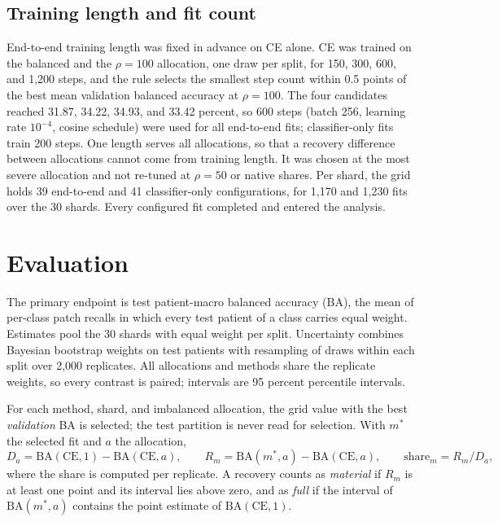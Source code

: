 \documentclass[11pt]{article}
\begin{document}
\subsection{Training length and fit count}
End-to-end training length was fixed in advance on CE alone. CE was trained on the balanced and the $\rho=100$ allocation, one draw per split, for 150, 300, 600, and 1,200 steps, and the rule selects the smallest step count within 0.5 points of the best mean validation balanced accuracy at $\rho=100$. The four candidates reached 31.87, 34.22, 34.93, and 33.42 percent, so 600 steps (batch 256, learning rate $10^{-4}$, cosine schedule) were used for all end-to-end fits; classifier-only fits train 200 steps. One length serves all allocations, so that a recovery difference between allocations cannot come from training length. It was chosen at the most severe allocation and not re-tuned at $\rho=50$ or native shares. Per shard, the grid holds 39 end-to-end and 41 classifier-only configurations, for 1,170 and 1,230 fits over the 30 shards. Every configured fit completed and entered the analysis.

\section{Evaluation}
\label{sec:evaluation}
The primary endpoint is test patient-macro balanced accuracy (BA), the mean of per-class patch recalls in which every test patient of a class carries equal weight. Estimates pool the 30 shards with equal weight per split. Uncertainty combines Bayesian bootstrap weights on test patients \citep{rubin1981bayesian} with resampling of draws within each split over 2,000 replicates. All allocations and methods share the replicate weights, so every contrast is paired; intervals are 95 percent percentile intervals.

For each method, shard, and imbalanced allocation, the grid value with the best \emph{validation} BA is selected; the test partition is never read for selection. With $m^{*}$ the selected fit and $a$ the allocation,
\begin{equation}
  D_a=\mathrm{BA}(\mathrm{CE},1)-\mathrm{BA}(\mathrm{CE},a),\qquad
  R_m=\mathrm{BA}(m^{*},a)-\mathrm{BA}(\mathrm{CE},a),\qquad
  \text{share}_m=R_m/D_a ,
  \label{eq:recovery}
\end{equation}
\noindent where the share is computed per replicate. A recovery counts as \emph{material} if $R_m$ is at least one point and its interval lies above zero, and as \emph{full} if the interval of $\mathrm{BA}(m^{*},a)$ contains the point estimate of $\mathrm{BA}(\mathrm{CE},1)$.
\end{document}
